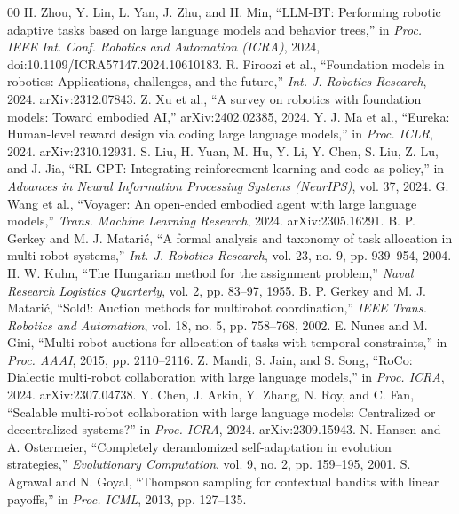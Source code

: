 \documentclass[conference]{IEEEtran}
\begin{document}
\begin{thebibliography}{00}
 H. Zhou, Y. Lin, L. Yan, J. Zhu, and H. Min, ``LLM-BT: Performing robotic adaptive tasks based on large language models and behavior trees,'' in \emph{Proc. IEEE Int. Conf. Robotics and Automation (ICRA)}, 2024, doi:10.1109/ICRA57147.2024.10610183.
 R. Firoozi et al., ``Foundation models in robotics: Applications, challenges, and the future,'' \emph{Int. J. Robotics Research}, 2024. arXiv:2312.07843.
 Z. Xu et al., ``A survey on robotics with foundation models: Toward embodied AI,'' arXiv:2402.02385, 2024.
 Y. J. Ma et al., ``Eureka: Human-level reward design via coding large language models,'' in \emph{Proc. ICLR}, 2024. arXiv:2310.12931.
 S. Liu, H. Yuan, M. Hu, Y. Li, Y. Chen, S. Liu, Z. Lu, and J. Jia, ``RL-GPT: Integrating reinforcement learning and code-as-policy,'' in \emph{Advances in Neural Information Processing Systems (NeurIPS)}, vol. 37, 2024.
 G. Wang et al., ``Voyager: An open-ended embodied agent with large language models,'' \emph{Trans. Machine Learning Research}, 2024. arXiv:2305.16291.
 B. P. Gerkey and M. J. Matari\'{c}, ``A formal analysis and taxonomy of task allocation in multi-robot systems,'' \emph{Int. J. Robotics Research}, vol. 23, no. 9, pp. 939--954, 2004.
 H. W. Kuhn, ``The Hungarian method for the assignment problem,'' \emph{Naval Research Logistics Quarterly}, vol. 2, pp. 83--97, 1955.
 B. P. Gerkey and M. J. Matari\'{c}, ``Sold!: Auction methods for multirobot coordination,'' \emph{IEEE Trans. Robotics and Automation}, vol. 18, no. 5, pp. 758--768, 2002.
 E. Nunes and M. Gini, ``Multi-robot auctions for allocation of tasks with temporal constraints,'' in \emph{Proc. AAAI}, 2015, pp. 2110--2116.
 Z. Mandi, S. Jain, and S. Song, ``RoCo: Dialectic multi-robot collaboration with large language models,'' in \emph{Proc. ICRA}, 2024. arXiv:2307.04738.
 Y. Chen, J. Arkin, Y. Zhang, N. Roy, and C. Fan, ``Scalable multi-robot collaboration with large language models: Centralized or decentralized systems?'' in \emph{Proc. ICRA}, 2024. arXiv:2309.15943.
 N. Hansen and A. Ostermeier, ``Completely derandomized self-adaptation in evolution strategies,'' \emph{Evolutionary Computation}, vol. 9, no. 2, pp. 159--195, 2001.
 S. Agrawal and N. Goyal, ``Thompson sampling for contextual bandits with linear payoffs,'' in \emph{Proc. ICML}, 2013, pp. 127--135.

\end{thebibliography}
\end{document}
